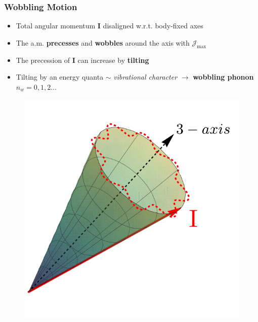 \documentclass{beamer}
\begin{document}
\begin{frame}
  \frametitle{Wobbling Motion}
\begin{itemize}
  \item Total angular momentum $\mathbf{I}$ disaligned w.r.t. body-fixed axes
  \item The a.m. \textbf{precesses} and \textbf{wobbles} around the axis with $\mathcal{J}_\text{max}$
  \item The precession of $\mathbf{I}$ can increase by \textbf{tilting} 
  \item Tilting by an energy quanta $\sim$ \emph{vibrational character} $\rightarrow$ \textbf{wobbling phonon} $n_w=0,1,2...$
\end{itemize}
  \begin{figure}
    \centering
    \includegraphics[scale=0.4]{Figs/precessional_cone_2.pdf}

\end{figure}
\end{frame}
\end{document}

